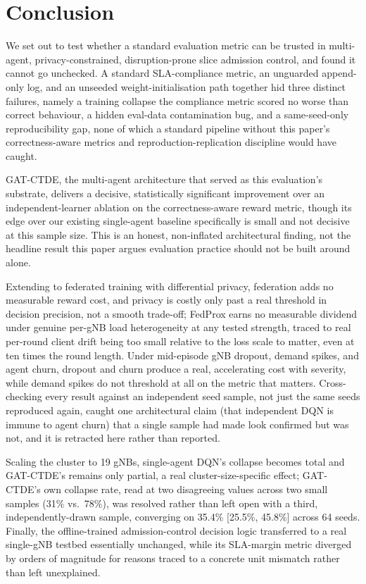 \documentclass[pdflatex,sn-basic,Numbered]{sn-jnl}%
\begin{document}
\section{Conclusion}
\label{sec:conclusion}
We set out to test whether a standard evaluation metric can be
trusted in multi-agent, privacy-constrained, disruption-prone slice
admission control, and found it cannot go unchecked. A standard SLA-compliance metric, an unguarded append-only log, and an unseeded weight-initialisation path together hid three distinct failures, namely a training collapse the compliance metric scored no worse than correct behaviour, a hidden eval-data contamination bug, and a same-seed-only reproducibility gap, none of which a standard pipeline without this paper's correctness-aware metrics and reproduction-replication discipline would have caught.

GAT-CTDE, the multi-agent architecture that served as this evaluation's substrate, delivers a decisive, statistically significant improvement over an independent-learner ablation on the correctness-aware reward metric, though its edge over our existing single-agent baseline specifically is small and not decisive at this sample size. This is an honest, non-inflated architectural finding, not the headline result this paper argues evaluation practice should not be built around alone.

Extending to federated training with differential privacy, federation
adds no measurable reward cost, and privacy is costly only past a real
threshold in decision precision, not a smooth trade-off; FedProx earns
no measurable dividend under genuine per-gNB load heterogeneity at any
tested strength, traced to real per-round client drift being too small
relative to the loss scale to matter, even at ten times the round
length. Under mid-episode gNB dropout, demand spikes, and agent churn, dropout and churn produce a real, accelerating cost with severity, while demand spikes do not threshold at all on the metric that matters. Cross-checking every result against an independent seed sample, not just the same seeds reproduced again, caught one architectural claim (that independent DQN is immune to agent churn) that a single sample had made look confirmed but was not, and it is retracted here rather than reported.

Scaling the cluster to 19 gNBs, single-agent DQN's collapse becomes
total and GAT-CTDE's remains only partial, a real cluster-size-specific
effect; GAT-CTDE's own collapse rate, read at two disagreeing values
across two small samples (31\% vs.\ 78\%), was resolved rather than
left open with a third, independently-drawn sample, converging on
35.4\% [25.5\%, 45.8\%] across 64 seeds. Finally, the offline-trained
admission-control decision logic transferred to a real single-gNB
testbed essentially unchanged, while its SLA-margin metric diverged by
orders of magnitude for reasons traced to a concrete unit mismatch
rather than left unexplained.
\end{document}
